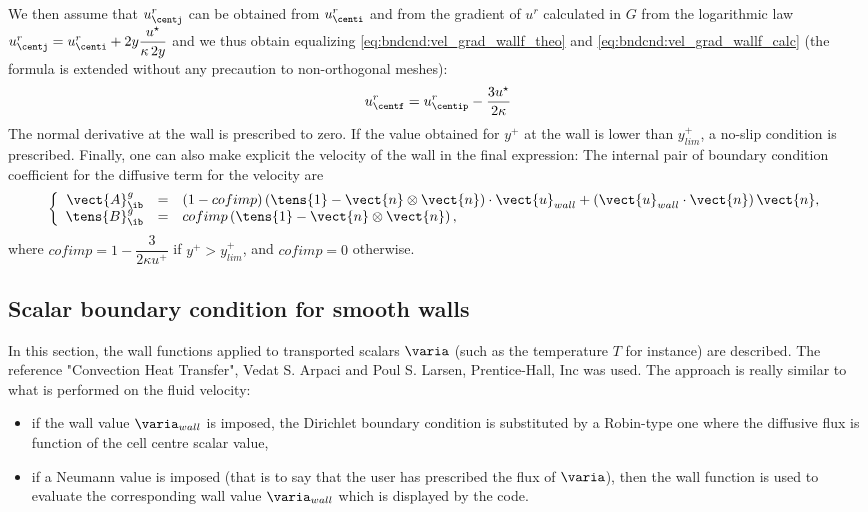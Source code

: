 We then assume that $u_{\centj}^r$ can be obtained from $u_{\centi}^r$
and from the gradient of $u^r$ calculated in $G$
from the logarithmic law
$u_{\centj}^r = u_{\centi}^r +2y \displaystyle\dfrac{u^\star}{\kappa\, 2y}$ and we thus
obtain equalizing \eqref{eq:bndcnd:vel_grad_wallf_theo} and \eqref{eq:bndcnd:vel_grad_wallf_calc}
 (the formula is extended without any precaution to non-orthogonal meshes):
%
\begin{equation}
u_{\centf}^r = u_{\centip}^r -  \dfrac{3 u^\star}{2\kappa }
\end{equation}
The normal derivative at the wall is prescribed to zero.
If the value obtained for $y^+$ at the wall is lower than $y^+_{lim}$,
a no-slip condition is prescribed. Finally, one can also
make explicit the velocity of the wall in the final expression:
%
The internal pair of boundary condition coefficient for the diffusive term for the velocity are
\begin{equation}
\left\lbrace
\begin{array}{r c l}
\vect{A}^g_\ib & = & \left( 1-cofimp \right) \left(\tens{1} - \vect{n} \otimes \vect{n} \right) \cdot  \vect{u}_{wall} + \left(\vect{u}_{wall} \cdot \vect{n} \right) \vect{n}, \\
\tens{B}^g_\ib & = & cofimp \left(\tens{1} - \vect{n} \otimes \vect{n} \right) ,
\end{array}
\right.
\end{equation}
where $cofimp = 1 - \dfrac{3}{2 \kappa u^+}$ if $y^+ > y^+_{lim}$, and $cofimp = 0$ otherwise.

\subsection{Scalar boundary condition for smooth walls}

In this section, the wall functions applied to transported scalars $\varia$ (such as the temperature $T$ for instance)
are described.
The reference "Convection Heat Transfer",
Vedat S. Arpaci and Poul S. Larsen, Prentice-Hall, Inc was used.
The approach is really similar to what is performed on the fluid velocity:
\begin{itemize}
\item if the wall value $\varia_{wall}$ is imposed, the Dirichlet boundary condition is
substituted by a Robin-type one where the diffusive flux is function of the cell centre scalar value,
\item if a Neumann value is imposed (that is to say that the user has prescribed the flux of $\varia$), then the wall
function is used to evaluate the corresponding wall value $\varia_{wall}$ which is displayed by the code.
\end{itemize}

